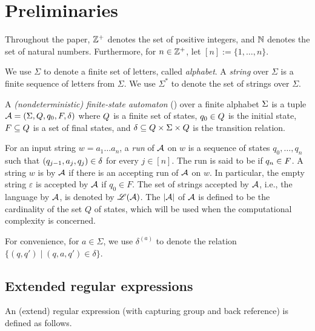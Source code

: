 
\section{Preliminaries}\label{sec:prel}

Throughout the paper, $\mathbb{Z}^+$ denotes the set of positive integers, and  $\mathbb{N}$ denotes the set of natural numbers. Furthermore, for $n\in \mathbb{Z}^+$, let $[n]:=\{1, \ldots, n\}$. 

We use $\Sigma$ to denote a finite set of letters, called \emph{alphabet}. A \emph{string} over $\Sigma$ is a finite sequence of letters from $\Sigma$. We use $\Sigma^*$ to denote the set of strings over $\Sigma$. 

\begin{definition} \label{def:nfa}
	A \emph{(nondeterministic) finite-state automaton}
	(\FA{}) over a finite alphabet $\Sigma$ is a tuple $\mathcal{A} =
	(\Sigma, Q, q_0, F, \delta)$ where 
	$Q$ is a finite set of 
	states, $q_0\in Q$ is
	the initial state, $F\subseteq Q$ is a set of final states, and 
	$\delta\subseteq Q \times 
	\Sigma \times  Q$ is the
	transition relation. 
\end{definition}

For an input string $w=a_1 \dots a_n$, a \emph{run} of $\mathcal{A}$ on $w$
is a sequence of states $q_0, \ldots, q_n$ such that $(q_{j-1}, a_{j}, q_{j}) \in
\delta$  for every $j \in [n]$.
The run is said to be  if $q_n \in F$.
A string $w$ is  by $\mathcal{A}$ if there is an accepting run of
$\mathcal{A}$ on $w$. In particular, the empty string $\varepsilon$ is accepted by $\mathcal{A}$ if $q_0 \in F$. The set of strings accepted by $\mathcal{A}$, i.e., the language  by $\mathcal{A}$, is denoted by $\mathscr{L}(\mathcal{A})$.
The  $|\mathcal{A}|$ of $\mathcal{A}$ is defined to be the cardinality of the set $Q$ of states, which will be 
used when the computational complexity is concerned.

For convenience, for $a \in \Sigma$, we use $\delta^{(a)}$ to denote the  relation $\{(q, q') \mid (q, a, q') \in \delta\}$.


  
 \subsection{Extended regular expressions}
An (extend) regular expression (with capturing group and back reference) is defined as follows.
  
